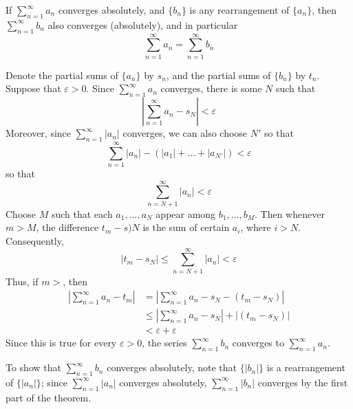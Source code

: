 \documentclass[12pt]{report}
\begin{document}
\begin{thm}{}{}
    If $\sum\limits_{n=1}^{\infty}a_n$ converges absolutely, and $\{b_n\}$ is any rearrangement of $\{a_n\}$, then $\sum\limits_{n=1}^{\infty}b_n$ also converges (absolutely), and in particular \begin{equation*}
        \sum\limits_{n=1}^{\infty}a_n = \sum\limits_{n=1}^{\infty}b_n
    \end{equation*}
\end{thm}
\begin{proof*}{}{}
    Denote the partial sums of $\{a_n\}$ by $s_n$, and the partial sums of $\{b_n\}$ by $t_n$. Suppose that $\varepsilon > 0$. Since $\sum\limits_{n=1}^{\infty}a_n$ converges, there is some $N$ such that \begin{equation*}
        \left|\sum\limits_{n=1}^{\infty}a_n - s_N\right| < \varepsilon
    \end{equation*}
    Moreover, since $\sum\limits_{n=1}^{\infty}|a_n|$ converges, we can also choose $N'$ so that \begin{equation*}
        \sum\limits_{n=1}^{\infty}|a_n| - (|a_1|+\hdots + |a_{N'}|) < \varepsilon
    \end{equation*}
    so that \begin{equation*}
        \sum\limits_{n=N+1}^{\infty}|a_n| < \varepsilon
    \end{equation*}
    Choose $M$ such that each $a_1,...,a_N$ appear among $b_1,...,b_M$. Then whenever $m > M$, the difference $t_m - s)N$ is the sum of certain $a_i$, where $i > N$. Consequently, \begin{equation*}
        |t_m-s_N| \leq \sum\limits_{n=N+1}^{\infty}|a_n| < \varepsilon
    \end{equation*}
    Thus, if $m > $, then \begin{align*}
        \left|\sum\limits_{n=1}^{\infty}a_n - t_m \right|&= \left|\sum\limits_{n=1}^{\infty}a_n - s_N - (t_m-s_N)\right| \\
        &\leq \left|\sum\limits_{n=1}^{\infty}a_n - s_N\right| +|(t_m-s_N)| \\
        &< \varepsilon + \varepsilon
    \end{align*}
    Since this is true for every $\varepsilon > 0$, the series $\sum\limits_{n=1}^{\infty}b_n$ converges to $\sum\limits_{n=1}^{\infty}a_n$.

    To show that $\sum\limits_{n=1}^{\infty}b_n$ converges absolutely, note that $\{|b_n|\}$ is a rearrangement of $\{|a_n|\}$; since $\sum\limits_{n=1}^{\infty}|a_n|$ converges absolutely, $\sum\limits_{n=1}^{\infty}|b_n|$ converges by the first part of the theorem.
\end{proof*}
\end{document}
